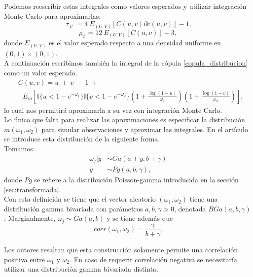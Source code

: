 \documentclass[11pt,a4paper]{article}
\begin{document}
Podemos reescribir estas integrales como valores esperados y utilizar integración Monte Carlo para aproximarlas:
\begin{equation} \label{tau_esperado}
\uptau_{\mathcal{C}} = 4 \ E_{(U, V)}\left[C(u, v) \partial c(u, v)\right] -1,
\end{equation}
\begin{equation} \label{rho_esperado}
\rho_{\mathcal{C}} = 12 \ E_{(U, V)}\left[C(u, v)\right] -3,
\end{equation}
donde $E_{(U, V)}$ es el valor esperado respecto a una densidad uniforme en \newline $(0, 1)\times (0, 1).$\\

A continuación escribimos también la integral de la cópula \eqref{copula_distribucion} como un valor esperado.
\begin{align*}
&C(u, v) = u \ + \ v \ - \ 1 \ +\\
& \ \ \ E_{m} \left[\mathbb{I}\lbrace u < 1-e^{-\omega_1}\rbrace \mathbb{I}\lbrace v < 1-e^{-\omega_2}\rbrace \left(1 + \frac{\log (1-u)}{\omega_1}\right)\left(1 + \frac{\log (1-v)}{\omega_2}\right)\right],
\end{align*}
lo cual nos permitirá aproximarla a su vez con integración Monte Carlo.\\

Lo único que falta para realizar las aproximaciones es especificar la distribución $m(\omega_1, \omega_2)$ para simular observaciones y aproximar las integrales. En el artículo \citet{nieto} se introduce esta distribución de la siguiente forma.\\

Tomamos
\begin{align*}
\omega_j | y &\sim Ga(a + y, b + \gamma)\\
y &\sim Pg(a, b, \gamma),
\end{align*}
donde $Pg$ se refiere a la distribución Poisson-gamma introducida en la sección \ref{sec:transformada}.\\

Con esta definición se tiene que el vector aleatorio $(\omega_1, \omega_2)$ tiene una distribución gamma bivariada con parámetros $a, b, \gamma > 0$, denotada $BGa(a, b, \gamma)$. Marginalmente, $\omega_j \sim Ga(a, b)$ y se tiene además que $$corr(\omega_1, \omega_2) = \frac{\gamma}{b + \gamma}.$$

Los autores resaltan que esta construcción solamente permite una correlación positiva entre $\omega_1$ y $\omega_2$. En caso de requerir correlación negativa se necesitaría utilizar una distribución gamma bivariada distinta.\\
\end{document}
